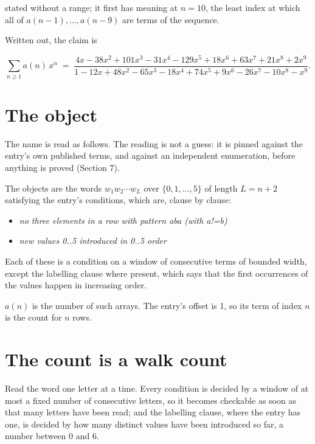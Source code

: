 \documentclass[11pt]{article}
\theoremstyle{definition}
\begin{document}
stated without a range; it first has meaning at $n = 10$, the least index at which all of $a(n-1),\dots,a(n-9)$ are terms of the sequence.

Written out, the claim is

\[\sum_{n \ge 1} a(n)\,x^n \;=\; \frac{4x - 38x^{2} + 101x^{3} - 31x^{4} - 129x^{5} + 18x^{6} + 63x^{7} + 21x^{8} + 2x^{9}}{1 - 12x + 48x^{2} - 65x^{3} - 18x^{4} + 74x^{5} + 9x^{6} - 26x^{7} - 10x^{8} - x^{9}}.\]

\section{The object}

The name is read as follows. The reading is not a guess: it is pinned against the entry's own published terms, and against an independent enumeration, before anything is proved (Section 7).

The objects are the words $w_1 w_2 \cdots w_L$ over $\{0,1,\dots,5\}$ of length $L = n + 2$ satisfying the entry's conditions, which are, clause by clause:

\begin{itemize}

\item {\itshape no three elements in a row with pattern aba (with a!=b)}

\item {\itshape new values 0..5 introduced in 0..5 order}

\end{itemize}

Each of these is a condition on a window of consecutive terms of bounded width, except the labelling clause where present, which says that the first occurrences of the values happen in increasing order.

$a(n)$ is the number of such arrays. The entry's offset is 1, so its term of index $n$ is the count for $n$ rows.

\section{The count is a walk count}

Read the word one letter at a time. Every condition is decided by a window of at most a fixed number of consecutive letters, so it becomes checkable as soon as that many letters have been read; and the labelling clause, where the entry has one, is decided by how many distinct values have been introduced so far, a number between $0$ and 6.
\end{document}
